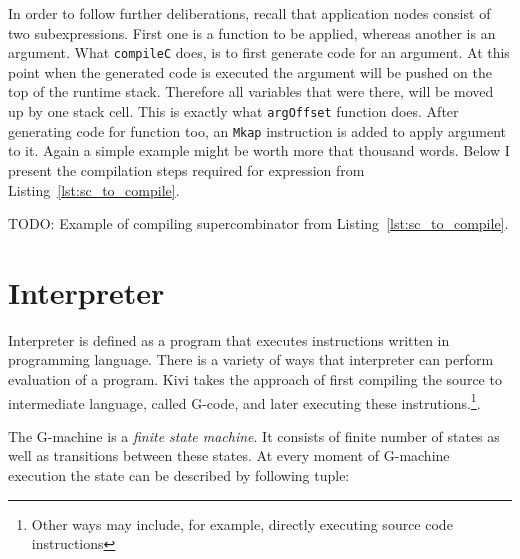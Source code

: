 \documentclass[12pt,a4paper]{report}
\begin{document}
In order to follow further deliberations, recall that application nodes consist
of two subexpressions. First one is a function to be applied, whereas another
is an argument. What \texttt{compileC} does, is to first generate code for an
argument. At this point when the generated code is executed the argument will
be pushed on the top of the runtime stack. Therefore all variables that were
there, will be moved up by one stack cell. This is exactly what
\texttt{argOffset} function does. After generating code for function too, an
\texttt{Mkap} instruction is added to apply argument to it. Again a simple
example might be worth more that thousand words. Below I present the
compilation steps required for expression from Listing~\ref{lst:sc_to_compile}.


TODO: Example of compiling supercombinator from Listing~\ref{lst:sc_to_compile}.


\section{Interpreter}
\label{sec:interpreter}
Interpreter is defined as a program that executes instructions written in
programming language. There is a variety of ways that interpreter can perform
evaluation of a program. Kivi takes the approach of first compiling the source
to intermediate language, called G-code, and later executing these
instrutions.\footnote{Other ways may include, for example, directly executing
source code instructions}.

The G-machine is a \textit{finite state machine}. It consists of finite number
of states as well as transitions between these states. At every moment of
G-machine execution the state can be described by following tuple:
\end{document}
